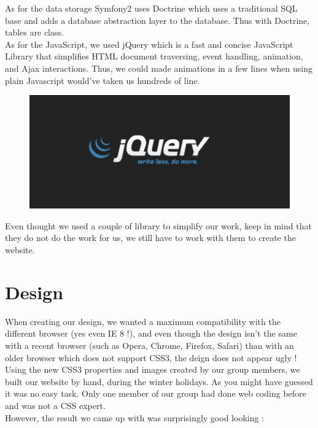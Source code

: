 \documentclass[article]{report} %
\begin{document}
As for the data storage Symfony2 uses Doctrine which uses a traditional SQL base and adds a database abstraction layer to the database. Thus with Doctrine, tables are class.\\

					As for the JavaScript, we used jQuery which is a fast and concise JavaScript Library that simplifies HTML document traversing, event handling, animation, and Ajax interactions. Thus, we could made animations in a few lines when using plain Javascript would've taken us hundreds of line.
\newpage
	
\begin{figure}[h]
					\includegraphics[scale=1]{images/Others/jquery.png}
				\end{figure}

					Even thought we used a couple of library to simplify our work, keep in mind that they do not do the work for us, we still have to work with them to create the website.\\
 
				\section{Design}
					When creating our design, we wanted a maximum compatibility with the different browser (yes even IE 8 !), and even though the design isn't the same with a recent browser (such as Opera, Chrome, Firefox, Safari) than with an older browser which does not support CSS3, the deign does not appear ugly ! \\

					Using the new CSS3 properties and images created by our group members, we built our website by hand, during the winter holidays. As you might have guessed it was no easy task. Only one member of our group had done web coding before and was not a CSS expert.\\

					However, the result we came up with was surprisingly good looking : 
 
\end{document}
